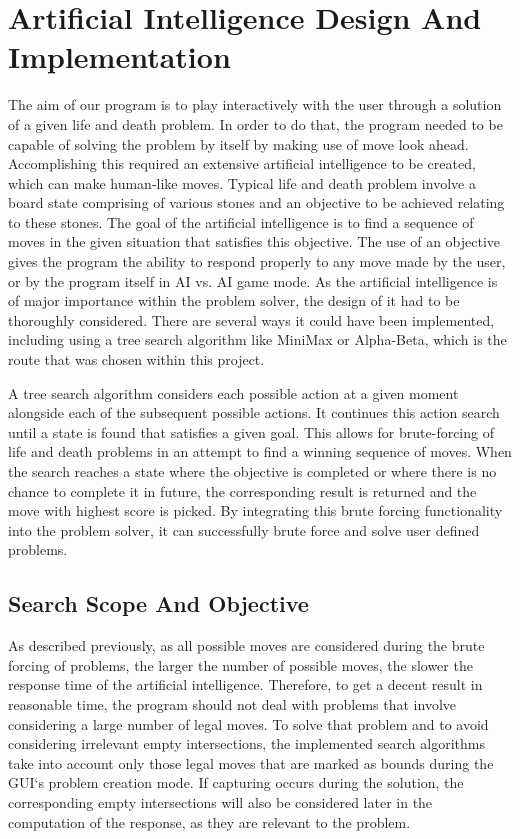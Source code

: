 \documentclass{l3proj}
\begin{document}
\section{Artificial Intelligence Design And Implementation}

The aim of our program is to play interactively with the user through a solution of a given life and death problem. In order to do that, the program needed to be capable of solving the problem by itself by making use of move look ahead. Accomplishing this required an extensive artificial intelligence to be created, which can make human-like moves. Typical life and death problem involve a board state comprising of various stones and an objective to be achieved relating to these stones. The goal of the artificial intelligence is to find a sequence of moves in the given situation that satisfies this objective. The use of an objective gives the program the ability to respond properly to any move made by the user, or by the program itself in AI vs. AI game mode. As the artificial intelligence is of major importance within the problem solver, the design of it had to be thoroughly considered. There are several ways it could have been implemented, including using a tree search algorithm like MiniMax or Alpha-Beta, which is the route that was chosen within this project.
 
A tree search algorithm considers each possible action at a given moment alongside each of the subsequent possible actions. It continues this action search until a state is found that satisfies a given goal. This allows for brute-forcing of life and death problems in an attempt to find a winning sequence of moves. When the search reaches a state where the objective is completed or where there is no chance to complete it in future, the corresponding result is returned and the move with highest score is picked. By integrating this brute forcing functionality into the problem solver, it can successfully brute force and solve user defined problems.

\subsection{Search Scope And Objective}\label{search_scope_objective}

As described previously, as all possible moves are considered during the brute forcing of problems, the larger the number of possible moves, the slower the response time of the artificial intelligence. Therefore, to get a decent result in reasonable time, the program should not deal with problems that involve considering a large number of legal moves. To solve that problem and to avoid considering irrelevant empty intersections, the implemented search algorithms take into account only those legal moves that are marked as bounds during the GUI`s problem creation mode. If capturing occurs during the solution, the corresponding empty intersections will also be considered later in the computation of the response, as they are relevant to the problem.
\end{document}

